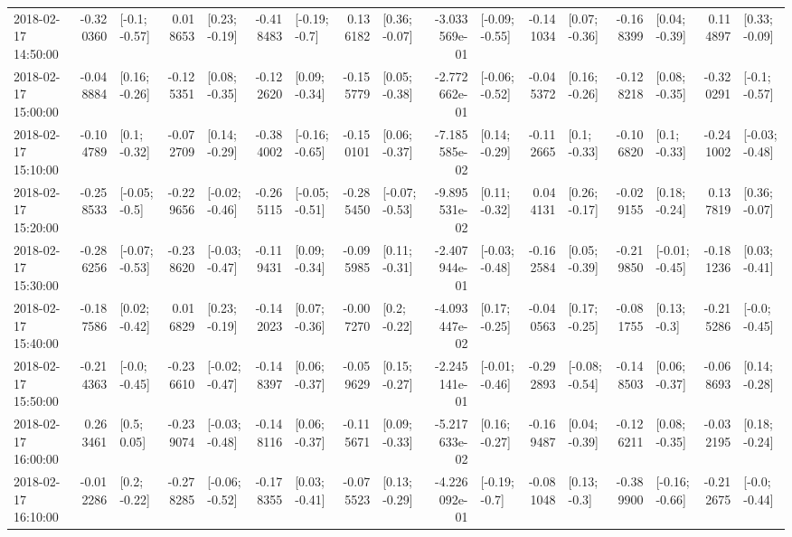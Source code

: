 \begin{tabular}{lrlrlrlrlrlrlrlrl}
2018-02-17 14:50:00 & -0.320360 &   [-0.1; -0.57] &  0.018653 &   [0.23; -0.19] & -0.418483 &   [-0.19; -0.7] &  0.136182 &   [0.36; -0.07] & -3.033569e-01 &  [-0.09; -0.55] & -0.141034 &   [0.07; -0.36] & -0.168399 &   [0.04; -0.39] &  0.114897 &   [0.33; -0.09] \\
2018-02-17 15:00:00 & -0.048884 &   [0.16; -0.26] & -0.125351 &   [0.08; -0.35] & -0.122620 &   [0.09; -0.34] & -0.155779 &   [0.05; -0.38] & -2.772662e-01 &  [-0.06; -0.52] & -0.045372 &   [0.16; -0.26] & -0.128218 &   [0.08; -0.35] & -0.320291 &   [-0.1; -0.57] \\
2018-02-17 15:10:00 & -0.104789 &    [0.1; -0.32] & -0.072709 &   [0.14; -0.29] & -0.384002 &  [-0.16; -0.65] & -0.150101 &   [0.06; -0.37] & -7.185585e-02 &   [0.14; -0.29] & -0.112665 &    [0.1; -0.33] & -0.106820 &    [0.1; -0.33] & -0.241002 &  [-0.03; -0.48] \\
2018-02-17 15:20:00 & -0.258533 &   [-0.05; -0.5] & -0.229656 &  [-0.02; -0.46] & -0.265115 &  [-0.05; -0.51] & -0.285450 &  [-0.07; -0.53] & -9.895531e-02 &   [0.11; -0.32] &  0.044131 &   [0.26; -0.17] & -0.029155 &   [0.18; -0.24] &  0.137819 &   [0.36; -0.07] \\
2018-02-17 15:30:00 & -0.286256 &  [-0.07; -0.53] & -0.238620 &  [-0.03; -0.47] & -0.119431 &   [0.09; -0.34] & -0.095985 &   [0.11; -0.31] & -2.407944e-01 &  [-0.03; -0.48] & -0.162584 &   [0.05; -0.39] & -0.219850 &  [-0.01; -0.45] & -0.181236 &   [0.03; -0.41] \\
2018-02-17 15:40:00 & -0.187586 &   [0.02; -0.42] &  0.016829 &   [0.23; -0.19] & -0.142023 &   [0.07; -0.36] & -0.007270 &    [0.2; -0.22] & -4.093447e-02 &   [0.17; -0.25] & -0.040563 &   [0.17; -0.25] & -0.081755 &    [0.13; -0.3] & -0.215286 &   [-0.0; -0.45] \\
2018-02-17 15:50:00 & -0.214363 &   [-0.0; -0.45] & -0.236610 &  [-0.02; -0.47] & -0.148397 &   [0.06; -0.37] & -0.059629 &   [0.15; -0.27] & -2.245141e-01 &  [-0.01; -0.46] & -0.292893 &  [-0.08; -0.54] & -0.148503 &   [0.06; -0.37] & -0.068693 &   [0.14; -0.28] \\
2018-02-17 16:00:00 &  0.263461 &     [0.5; 0.05] & -0.239074 &  [-0.03; -0.48] & -0.148116 &   [0.06; -0.37] & -0.115671 &   [0.09; -0.33] & -5.217633e-02 &   [0.16; -0.27] & -0.169487 &   [0.04; -0.39] & -0.126211 &   [0.08; -0.35] & -0.032195 &   [0.18; -0.24] \\
2018-02-17 16:10:00 & -0.012286 &    [0.2; -0.22] & -0.278285 &  [-0.06; -0.52] & -0.178355 &   [0.03; -0.41] & -0.075523 &   [0.13; -0.29] & -4.226092e-01 &   [-0.19; -0.7] & -0.081048 &    [0.13; -0.3] & -0.389900 &  [-0.16; -0.66] & -0.212675 &   [-0.0; -0.44] \\

\end{tabular}
